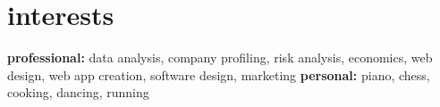 \documentclass[]{friggeri-cv-a4}
\begin{document}
\section{interests}

\textbf{professional:} data analysis, company profiling, risk analysis, economics, web design, web app creation, software design, marketing \textbf{personal:} piano, chess, cooking, dancing, running









\end{document}
